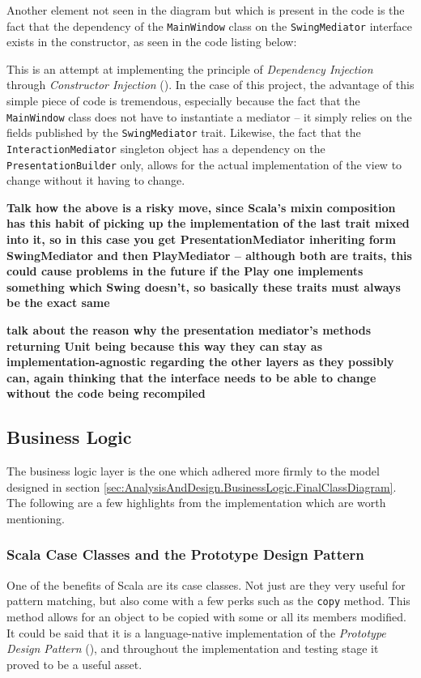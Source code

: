Another element not seen in the diagram but which is present in the code is the
fact that the dependency of the \texttt{MainWindow} class on the
\texttt{SwingMediator} interface exists in the constructor, as seen in the code
listing below:
{
  \small
  
}

This is an attempt at implementing the principle of \emph{Dependency Injection}
through \emph{Constructor Injection} (\cite[][]{fowler2004inversion}). In the
case of this project, the advantage of this simple piece of code is tremendous,
especially because the fact that the \texttt{MainWindow} class does not have to
instantiate a mediator -- it simply relies on the fields published by the
\texttt{SwingMediator} trait. Likewise, the fact that the
\texttt{InteractionMediator} singleton object has a dependency on the
\texttt{PresentationBuilder} only, allows for the actual implementation of the
view to change without it having to change.


\textbf{Talk how the above is a risky move, since Scala's mixin composition has
this habit of picking up the implementation of the last trait mixed into it, so
in this case you get PresentationMediator inheriting form SwingMediator and
then PlayMediator -- although both are traits, this could cause problems in the
future if the Play one implements something which Swing doesn't, so basically
these traits must always be the exact same}

\textbf{talk about the reason why the presentation mediator's methods returning
Unit being because this way they can stay as implementation-agnostic regarding
the other layers as they possibly can, again thinking that the interface needs
to be able to change without the code being recompiled}



\subsection{Business Logic} \label{sec:Implementation.BusinessLogic}

The business logic layer is the one which adhered more firmly to the model
designed in section
\ref{sec:AnalysisAndDesign.BusinessLogic.FinalClassDiagram}. The following are
a few highlights from the implementation which are worth mentioning.

\subsubsection{Scala Case Classes and the Prototype Design Pattern} \label{sec:Implementation.ScalaCaseClasses}
One of the benefits of Scala are its case classes. Not just are they very
useful for pattern matching, but also come with a few perks such as the
\texttt{copy} method. This method allows for an object to be copied with some
or all its members modified. It could be said that it is a language-native
implementation of the \emph{Prototype Design Pattern}
(\cite[][Ch.~6,~Location~2461]{nikolov2016scala}), and throughout the
implementation and testing stage it proved to be a useful asset.

